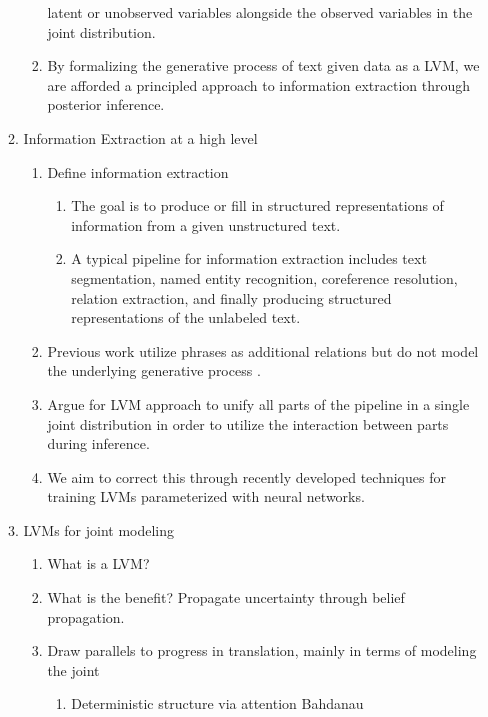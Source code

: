 \documentclass[12pt]{article}
\begin{document}
\begin{enumerate}
\begin{enumerate}
\begin{enumerate}
            latent or unobserved variables alongside the observed variables
            in the joint distribution.
        \item By formalizing the generative process of text given data as a LVM,
            we are afforded a principled approach to information extraction
            through posterior inference.
        \end{enumerate}
    \item Information Extraction at a high level
        \begin{enumerate}
        \item Define information extraction
            \begin{enumerate}
            \item The goal is to produce or fill in structured representations of information from
                a given unstructured text.
            \item A typical pipeline for information extraction includes
                text segmentation, named entity recognition, coreference resolution,
                relation extraction, and finally producing structured representations of the unlabeled text.
            \end{enumerate}
        \item Previous work utilize phrases as
            additional relations but do not model the underlying generative process
            \citep{cui2018neuralopenie,qu2017ssre}.
        \item Argue for LVM approach to unify all parts of the pipeline in a single joint distribution
            in order to utilize the interaction between parts during inference.
        \item We aim to correct this through recently developed techniques for training LVMs
            parameterized with neural networks.
        \end{enumerate}
    \item LVMs for joint modeling
        \begin{enumerate}
        \item What is a LVM?
        \item What is the benefit? Propagate uncertainty through belief propagation.
        \item Draw parallels to progress in translation, mainly in terms of modeling the joint
            \begin{enumerate}
            \item Deterministic structure via attention Bahdanau

\end{enumerate}
\end{enumerate}
\end{enumerate}
\end{enumerate}
\end{document}
